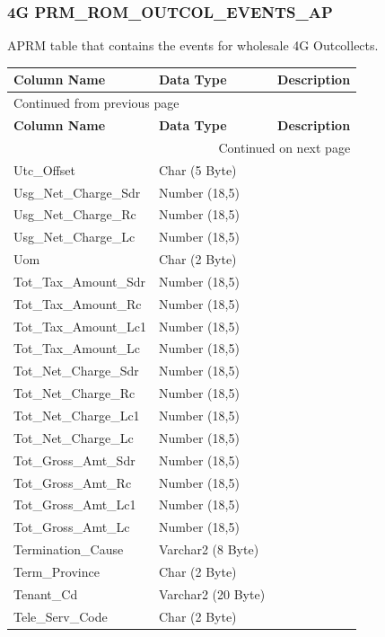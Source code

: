 \documentclass[12pt,twoside]{article}
\begin{document}
\subsubsection{4G PRM\_ROM\_OUTCOL\_EVENTS\_AP}
\label{sec:orgheadline76}
APRM table that contains the events for wholesale 4G Outcollects.
\footnotesize

\begin{longtable}{l|l|l}
\hline
\textbf{Column Name} & \textbf{Data Type} & \textbf{Description}\\
\hline
\endfirsthead
\multicolumn{3}{l}{Continued from previous page} \\
\hline

\textbf{Column Name} & \textbf{Data Type} & \textbf{Description} \\

\hline
\endhead
\hline\multicolumn{3}{r}{Continued on next page} \\
\endfoot
\endlastfoot
\hline
Utc\_Offset & Char (5 Byte) & \\
Usg\_Net\_Charge\_Sdr & Number (18,5) & \\
Usg\_Net\_Charge\_Rc & Number (18,5) & \\
Usg\_Net\_Charge\_Lc & Number (18,5) & \\
Uom & Char (2 Byte) & \\
Tot\_Tax\_Amount\_Sdr & Number (18,5) & \\
Tot\_Tax\_Amount\_Rc & Number (18,5) & \\
Tot\_Tax\_Amount\_Lc1 & Number (18,5) & \\
Tot\_Tax\_Amount\_Lc & Number (18,5) & \\
Tot\_Net\_Charge\_Sdr & Number (18,5) & \\
Tot\_Net\_Charge\_Rc & Number (18,5) & \\
Tot\_Net\_Charge\_Lc1 & Number (18,5) & \\
Tot\_Net\_Charge\_Lc & Number (18,5) & \\
Tot\_Gross\_Amt\_Sdr & Number (18,5) & \\
Tot\_Gross\_Amt\_Rc & Number (18,5) & \\
Tot\_Gross\_Amt\_Lc1 & Number (18,5) & \\
Tot\_Gross\_Amt\_Lc & Number (18,5) & \\
Termination\_Cause & Varchar2 (8 Byte) & \\
Term\_Province & Char (2 Byte) & \\
Tenant\_Cd & Varchar2 (20 Byte) & \\
Tele\_Serv\_Code & Char (2 Byte) & \\

\end{longtable}
\end{document}
